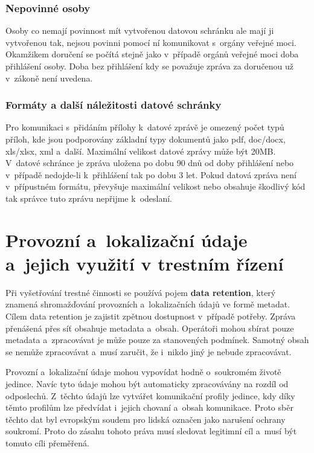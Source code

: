 \subsubsection{Nepovinné osoby}

Osoby co nemají povinnost mít vytvořenou datovou schránku ale mají ji vytvořenou tak, nejsou povinni pomocí ní komunikovat s~orgány veřejné moci. Okamžikem doručení se počítá stejně jako v~případě orgánů veřejné moci doba přihlášení osoby. Doba bez přihlášení kdy se považuje zpráva za doručenou už v~zákoně není uvedena.

\subsubsection{Formáty a další náležitosti datové schránky}

Pro komunikaci s~přidáním přílohy k~datové zprávě je omezený počet typů příloh, kde jsou podporovány základní typy dokumentů jako pdf, doc/docx, xls/xlsx, xml a~další. Maximální velikost datové zprávy může být 20MB. V~datové schránce je zpráva uložena po dobu 90 dnů od doby přihlášení nebo v~případě nedojde-li k~přihlášení tak po dobu 3 let. Pokud datová zpráva není v~přípustném formátu, převyšuje maximální velikost nebo obsahuje škodlivý kód tak správce tuto zprávu nepřijme k~odeslaní.













\clearpage
\section{Provozní a~lokalizační údaje a~jejich využití v trestním řízení}
\vspace{-0,5cm}
Při vyšetřování trestné činnosti se používá pojem \textbf{data retention}, který znamená shromažďování provozních a~lokalizačních údajů ve formě metadat. Cílem data retention je zajistit zpětnou dostupnost v~případě potřeby. Zpráva přenášená přes síť obsahuje metadata a~obsah. Operátoři mohou sbírat pouze metadata a~zpracovávat je může pouze za stanovených podmínek. Samotný obsah se nemůže zpracovávat a~musí zaručit, že i~nikdo jiný je nebude zpracovávat. 

Provozní a~lokalizační údaje mohou vypovídat hodně o~soukromém životě jedince. Navíc tyto údaje mohou být automaticky zpracovávány na rozdíl od odposlechů. Z~těchto údajů lze vytvářet komunikační profily jedince, kdy díky těmto profilům lze předvídat i~jejich chovaní a~obsah komunikace. Proto sběr těchto dat byl evropským soudem pro lidská označen jako narušení ochrany soukromí. Proto do zásahu tohoto práva musí sledovat legitimní cíl a~musí být tomuto cíli přeměřená.

